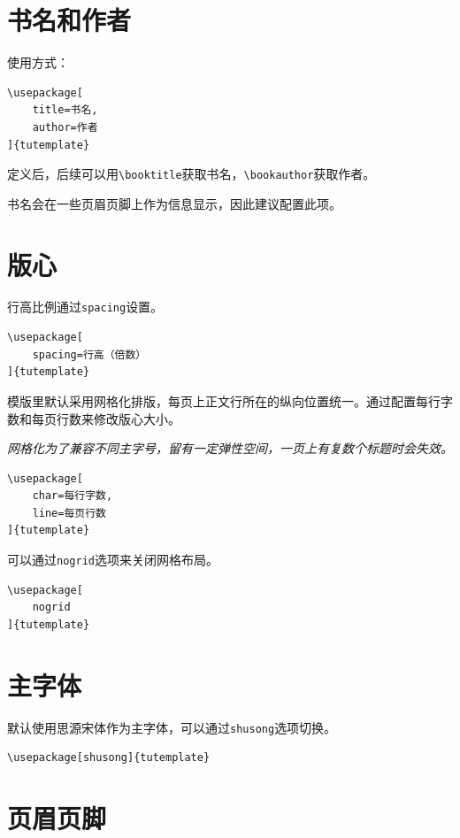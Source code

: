 \documentclass[10pt,openany]{book}
\begin{document}
\label{template-option}

\section{书名和作者}

使用方式：

\begin{verbatim}
\usepackage[
    title=书名,
    author=作者
]{tutemplate}
\end{verbatim}

定义后，后续可以用\verb|\booktitle|获取书名，\verb|\bookauthor|获取作者。

书名会在一些页眉页脚上作为信息显示，因此建议配置此项。

\section{版心}

行高比例通过\verb|spacing|设置。

\begin{verbatim}
\usepackage[
    spacing=行高（倍数）
]{tutemplate}
\end{verbatim}

\blankpar

模版里默认采用网格化排版，每页上正文行所在的纵向位置统一。通过配置每行字数和每页行数来修改版心大小。

\textit{网格化为了兼容不同主字号，留有一定弹性空间，一页上有复数个标题时会失效。}

\begin{verbatim}
\usepackage[
    char=每行字数,
    line=每页行数
]{tutemplate}
\end{verbatim}

可以通过\verb|nogrid|选项来关闭网格布局。

\begin{verbatim}
\usepackage[
    nogrid
]{tutemplate}
\end{verbatim}

\section{主字体}

默认使用思源宋体作为主字体，可以通过\verb|shusong|选项切换。

\begin{verbatim}
\usepackage[shusong]{tutemplate}
\end{verbatim}

\section{页眉页脚}
\end{document}
